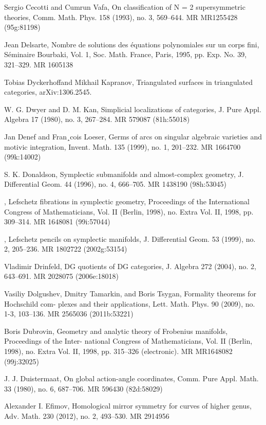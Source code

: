 {\begin{list}{}{%
  \setlength{\leftmargin}{3.4em}%
  \setlength{\itemindent}{-3.4em}%
  \setlength{\itemsep}{1.5pt}%
  \setlength{\parsep}{0pt}%
  \setlength{\listparindent}{0pt}%
}
\item[{[CV93]}] Sergio Cecotti and Cumrun Vafa, On classification of N = 2 supersymmetric theories, Comm. Math. Phys. 158 (1993), no. 3, 569--644. MR MR1255428 (95g:81198)
\item[{[Del95]}] Jean Delsarte, Nombre de solutions des équations polynomiales sur un corps fini, Séminaire Bourbaki, Vol. 1, Soc. Math. France, Paris, 1995, pp. Exp. No. 39, 321--329. MR 1605138
\item[{[DK]}] Tobias Dyckerhoffand Mikhail Kapranov, Triangulated surfaces in triangulated categories, arXiv:1306.2545.
\item[{[DK80]}] W. G. Dwyer and D. M. Kan, Simplicial localizations of categories, J. Pure Appl. Algebra 17 (1980), no. 3, 267--284. MR 579087 (81h:55018)
\item[{[DL99]}] Jan Denef and Fran¸cois Loeser, Germs of arcs on singular algebraic varieties and motivic integration, Invent. Math. 135 (1999), no. 1, 201--232. MR 1664700 (99k:14002)
\item[{[Don96]}] S. K. Donaldson, Symplectic submanifolds and almost-complex geometry, J. Differential Geom. 44 (1996), no. 4, 666--705. MR 1438190 (98h:53045)
\item[{[Don98]}] , Lefschetz fibrations in symplectic geometry, Proceedings of the International Congress of Mathematicians, Vol. II (Berlin, 1998), no. Extra Vol. II, 1998, pp. 309--314. MR 1648081 (99i:57044)
\item[{[Don99]}] , Lefschetz pencils on symplectic manifolds, J. Differential Geom. 53 (1999), no. 2, 205--236. MR 1802722 (2002g:53154)
\item[{[Dri04]}] Vladimir Drinfeld, DG quotients of DG categories, J. Algebra 272 (2004), no. 2, 643--691. MR 2028075 (2006e:18018)
\item[{[DTT09]}] Vasiliy Dolgushev, Dmitry Tamarkin, and Boris Tsygan, Formality theorems for Hochschild com- plexes and their applications, Lett. Math. Phys. 90 (2009), no. 1-3, 103--136. MR 2565036 (2011b:53221)
\item[{[Dub98]}] Boris Dubrovin, Geometry and analytic theory of Frobenius manifolds, Proceedings of the Inter- national Congress of Mathematicians, Vol. II (Berlin, 1998), no. Extra Vol. II, 1998, pp. 315--326 (electronic). MR MR1648082 (99j:32025)
\item[{[Dui80]}] J. J. Duistermaat, On global action-angle coordinates, Comm. Pure Appl. Math. 33 (1980), no. 6, 687--706. MR 596430 (82d:58029)
\item[{[Eﬁ12]}] Alexander I. Efimov, Homological mirror symmetry for curves of higher genus, Adv. Math. 230 (2012), no. 2, 493--530. MR 2914956

\end{list}}
